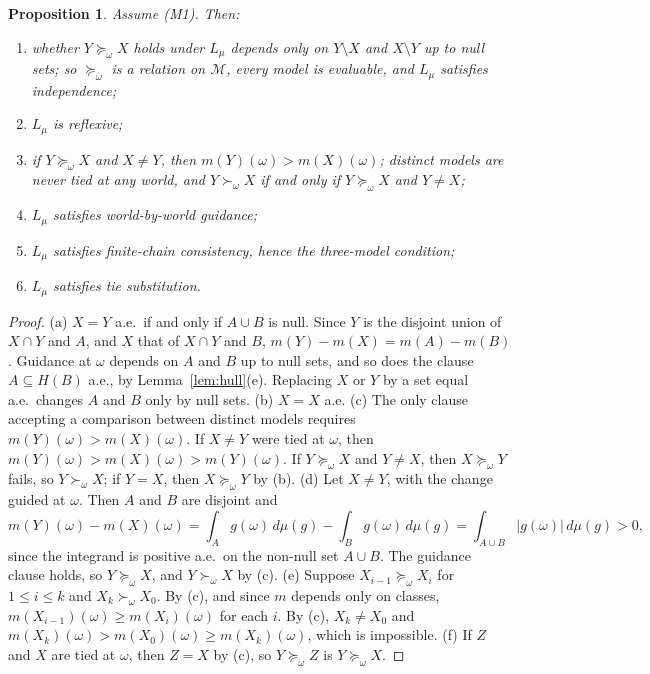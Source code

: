 \documentclass[11pt]{article}
\newtheorem{proposition}[theorem]{Proposition}
\theoremstyle{definition}
\newcommand{\M}{\mathcal M}
\newcommand{\Lmu}{L_\mu}
\begin{document}
\begin{proposition}\label{prop:elementary}
Assume (M1). Then:
\begin{enumerate}[label=(\alph*)]
\item whether $Y\succeq_\omega X$ holds under $\Lmu$ depends only on $Y\setminus X$ and $X\setminus Y$ up to null sets; so $\succeq_\omega$ is a relation on $\M$, every model is evaluable, and $\Lmu$ satisfies independence;
\item $\Lmu$ is reflexive;
\item if $Y\succeq_\omega X$ and $X\ne Y$, then $m(Y)(\omega)>m(X)(\omega)$; distinct models are never tied at any world, and $Y\succ_\omega X$ if and only if $Y\succeq_\omega X$ and $Y\ne X$;
\item $\Lmu$ satisfies world-by-world guidance;
\item $\Lmu$ satisfies finite-chain consistency, hence the three-model condition;
\item $\Lmu$ satisfies tie substitution.
\end{enumerate}
\end{proposition}
\begin{proof}
(a) $X=Y$ a.e.\ if and only if $A\cup B$ is null. Since $Y$ is the disjoint union of $X\cap Y$ and $A$, and $X$ that of $X\cap Y$ and $B$, $m(Y)-m(X)=m(A)-m(B)$. Guidance at $\omega$ depends on $A$ and $B$ up to null sets, and so does the clause $A\subseteq H(B)$ a.e., by Lemma~\ref{lem:hull}(e). Replacing $X$ or $Y$ by a set equal a.e.\ changes $A$ and $B$ only by null sets.
(b) $X=X$ a.e.
(c) The only clause accepting a comparison between distinct models requires $m(Y)(\omega)>m(X)(\omega)$. If $X\ne Y$ were tied at $\omega$, then $m(Y)(\omega)>m(X)(\omega)>m(Y)(\omega)$. If $Y\succeq_\omega X$ and $Y\ne X$, then $X\succeq_\omega Y$ fails, so $Y\succ_\omega X$; if $Y=X$, then $X\succeq_\omega Y$ by (b).
(d) Let $X\ne Y$, with the change guided at $\omega$. Then $A$ and $B$ are disjoint and
\[
m(Y)(\omega)-m(X)(\omega)=\int_Ag(\omega)\,d\mu(g)-\int_Bg(\omega)\,d\mu(g)=\int_{A\cup B}|g(\omega)|\,d\mu(g)>0,
\]
since the integrand is positive a.e.\ on the non-null set $A\cup B$. The guidance clause holds, so $Y\succeq_\omega X$, and $Y\succ_\omega X$ by (c).
(e) Suppose $X_{i-1}\succeq_\omega X_i$ for $1\le i\le k$ and $X_k\succ_\omega X_0$. By (c), and since $m$ depends only on classes, $m(X_{i-1})(\omega)\ge m(X_i)(\omega)$ for each $i$. By (c), $X_k\ne X_0$ and $m(X_k)(\omega)>m(X_0)(\omega)\ge m(X_k)(\omega)$, which is impossible.
(f) If $Z$ and $X$ are tied at $\omega$, then $Z=X$ by (c), so $Y\succeq_\omega Z$ is $Y\succeq_\omega X$.
\end{proof}
\end{document}
